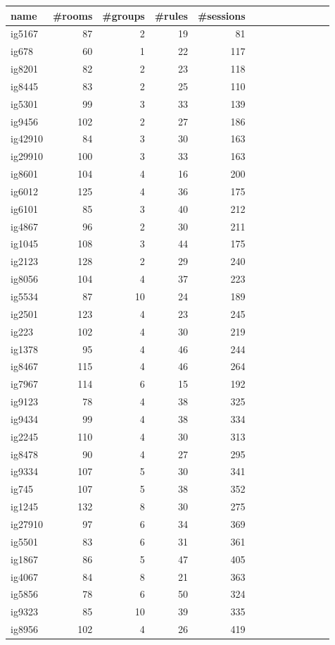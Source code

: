 \begin{longtable}{lrrrrrrrrrrrr}
\hline
name & \#rooms & \#groups & \#rules & \#sessions \\
\hline
ig5167 & 87 & 2 & 19 & 81 \\
ig678 & 60 & 1 & 22 & 117 \\
ig8201 & 82 & 2 & 23 & 118 \\
ig8445 & 83 & 2 & 25 & 110 \\
ig5301 & 99 & 3 & 33 & 139 \\
ig9456 & 102 & 2 & 27 & 186 \\
ig42910 & 84 & 3 & 30 & 163 \\
ig29910 & 100 & 3 & 33 & 163 \\
ig8601 & 104 & 4 & 16 & 200 \\
ig6012 & 125 & 4 & 36 & 175 \\
ig6101 & 85 & 3 & 40 & 212 \\
ig4867 & 96 & 2 & 30 & 211 \\
ig1045 & 108 & 3 & 44 & 175 \\
ig2123 & 128 & 2 & 29 & 240 \\
ig8056 & 104 & 4 & 37 & 223 \\
ig5534 & 87 & 10 & 24 & 189 \\
ig2501 & 123 & 4 & 23 & 245 \\
ig223 & 102 & 4 & 30 & 219 \\
ig1378 & 95 & 4 & 46 & 244 \\
ig8467 & 115 & 4 & 46 & 264 \\
ig7967 & 114 & 6 & 15 & 192 \\
ig9123 & 78 & 4 & 38 & 325 \\
ig9434 & 99 & 4 & 38 & 334 \\
ig2245 & 110 & 4 & 30 & 313 \\
ig8478 & 90 & 4 & 27 & 295 \\
ig9334 & 107 & 5 & 30 & 341 \\
ig745 & 107 & 5 & 38 & 352 \\
ig1245 & 132 & 8 & 30 & 275 \\
ig27910 & 97 & 6 & 34 & 369 \\
ig5501 & 83 & 6 & 31 & 361 \\
ig1867 & 86 & 5 & 47 & 405 \\
ig4067 & 84 & 8 & 21 & 363 \\
ig5856 & 78 & 6 & 50 & 324 \\
ig9323 & 85 & 10 & 39 & 335 \\
ig8956 & 102 & 4 & 26 & 419 \\

\end{longtable}
